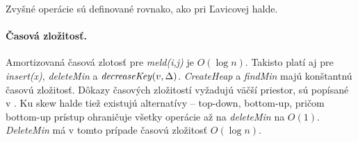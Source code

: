 Zvyšné operácie sú definované rovnako, ako pri Ľavicovej halde.

\paragraph{Časová zložitosť.}
Amortizovaná časová zlotosť pre \emph{meld(i,j)} je $O(\log n)$.
Takisto platí aj pre \emph{insert(x)}, \emph{deleteMin} a $\mathop{\mathit{decreaseKey}}(v,\Delta)$. \emph{CreateHeap} a \emph{findMin} majú konštantnú časovú zložitosť. Dôkazy časových zložitostí vyžadujú väčší priestor, sú popísané v \cite{skew}.
Ku skew halde tiež existujú alternatívy -- top-down, bottom-up, pričom bottom-up prístup ohraničuje všetky operácie až na 
\emph{deleteMin} na $O(1)$. \emph{DeleteMin} má v tomto prípade časovú zložitosť $O(\log n)$.